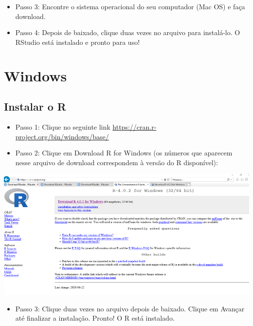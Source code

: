 \documentclass[
  10pt,
  brazil,
  a4paper,
  twoside, notitlepage, openright]{book}
\providecommand{\tightlist}{%
  \setlength{\itemsep}{0pt}\setlength{\parskip}{0pt}}
\begin{document}
\begin{itemize}
\tightlist
\item
  Passo 3: Encontre o sistema operacional do seu computador (Mac OS) e faça download.\\
\item
  Passo 4: Depois de baixado, clique duas vezes no arquivo para instalá-lo. O RStudio está instalado e pronto para uso!
\end{itemize}

\hypertarget{windows}{%
\section{Windows}\label{windows}}

\hypertarget{instalar-o-r-2}{%
\subsection{Instalar o R}\label{instalar-o-r-2}}

\begin{itemize}
\tightlist
\item
  Passo 1: Clique no seguinte link \url{https://cran.r-project.org/bin/windows/base/}\\
\item
  Passo 2: Clique em Download R for Windows (os números que aparecem nesse arquivo de download correspondem à versão do R disponível):
\end{itemize}

\includegraphics[width=13.54in]{img/inst_1_rwindows}

\begin{itemize}
\tightlist
\item
  Passo 3: Clique duas vezes no arquivo depois de baixado. Clique em Avançar até finalizar a instalação. Pronto! O R está instalado.
\end{itemize}
\end{document}
